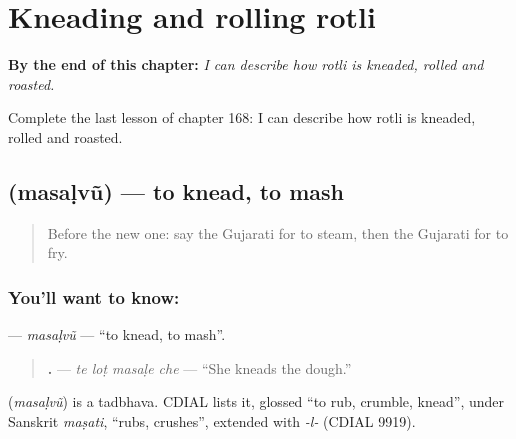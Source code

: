 
\chapter{Kneading and rolling rotli}
\label{ch:gu-kneading-and-rolling-rotli}

\begin{chapteropening}
\textbf{By the end of this chapter:} \emph{I can describe how rotli is kneaded, rolled and roasted.}

Complete the last lesson of chapter 168: I can describe how rotli is kneaded, rolled and roasted.
\end{chapteropening}

\section[\texorpdfstring{\gu{મસળવું} (masaḷvũ)}{મસળવું (masaḷvũ)}]{ (masaḷvũ) — to knead, to mash}

\label{lesson:GU-C168-masalvu}



\begin{quote}
Before the new one: say the Gujarati for to steam, then the Gujarati for to fry.
\end{quote}

\subsection*{You'll want to know: }
\textbf{} — \emph{masaḷvũ} — \textquotedblleft{}to knead, to mash\textquotedblright{}.

\begin{quote}
\textbf{   .} — \emph{te loṭ masaḷe che} — \textquotedblleft{}She kneads the dough.\textquotedblright{}
\end{quote}

\begin{cousinweb}
\textbf{} (\emph{masaḷvũ}) is a tadbhava. CDIAL lists it, glossed \textquotedblleft{}to rub, crumble, knead\textquotedblright{}, under Sanskrit \emph{maṣati}, \textquotedblleft{}rubs, crushes\textquotedblright{}, extended with \emph{-l-} (CDIAL 9919).
\end{cousinweb}

